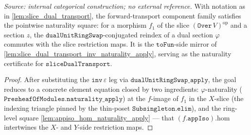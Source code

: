 \begin{lemma}


  \label{lem:slice_dual_transport_naturality_apply}
  \textit{Source: internal categorical construction; no external reference.}
  With notation as in \cref{lem:slice_dual_transport}, the forward-transport component family
  satisfies the pointwise naturality square: for a morphism \(f_1\) of the slice
  \((\mathtt{Over}\,V)^{\mathrm{op}}\) and a section \(z\), the \(\mathtt{dualUnitRingSwap}\)-conjugated
  reindex of a dual section \(\varphi\) commutes with the slice restriction maps. It is
  the \(\mathtt{toFun}\)-side mirror of \cref{lem:slice_dual_transport_inv_naturality_apply},
  serving as the naturality certificate for \(\mathtt{sliceDualTransport}\).
\end{lemma}
\begin{proof}
  \leanok
  After substituting the \(\mathtt{inv}\,\varepsilon\) leg via
  \(\mathtt{dualUnitRingSwap\_apply}\), the goal reduces to a concrete element equation closed by two
  ingredients: \(\varphi\)-naturality (\(\mathtt{PresheafOfModules.naturality\_apply}\)) at the
  \(f\)-image of \(f_1\) in the \(X\)-slice (the indexing triangle pinned by the thin-poset
  \(\mathtt{Subsingleton.elim}\)), and the ring-level square \cref{lem:appiso_hom_naturality_apply}
  --- that \((f.\mathtt{appIso}).\mathrm{hom}\) intertwines the \(X\)- and \(Y\)-side
  restriction maps.
\end{proof}


